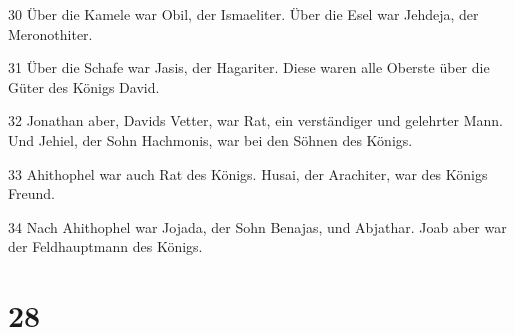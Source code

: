 \par 30 Über die Kamele war Obil, der Ismaeliter. Über die Esel war Jehdeja, der Meronothiter.
\par 31 Über die Schafe war Jasis, der Hagariter. Diese waren alle Oberste über die Güter des Königs David.
\par 32 Jonathan aber, Davids Vetter, war Rat, ein verständiger und gelehrter Mann. Und Jehiel, der Sohn Hachmonis, war bei den Söhnen des Königs.
\par 33 Ahithophel war auch Rat des Königs. Husai, der Arachiter, war des Königs Freund.
\par 34 Nach Ahithophel war Jojada, der Sohn Benajas, und Abjathar. Joab aber war der Feldhauptmann des Königs.

\chapter{28}

